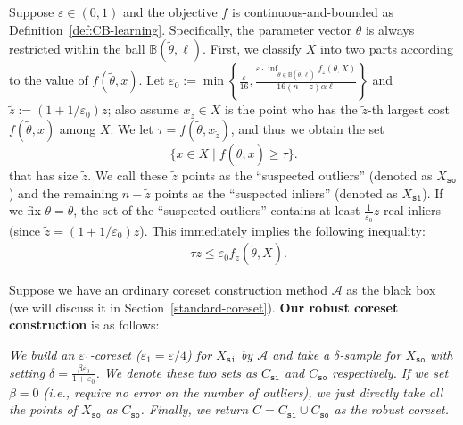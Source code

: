 \documentclass{article}
\begin{document}
Suppose $\varepsilon\in(0,1)$ and  the objective $f$ is continuous-and-bounded as Definition~\ref{def:CB-learning}. Specifically, the parameter vector $\theta$ is always restricted within the ball $\mathbb{B}(\tilde{\theta}, \ell)$.  
First, we classify $ X $ into two parts according to the value of $ f(\tilde{\theta},x) $. 
Let  $\varepsilon_0 := \min \left\{ \frac{\varepsilon}{16},\frac{\varepsilon\cdot\inf_{\theta\in\mathbb{B}(\tilde{\theta}, \ell)} f_z(\theta,X)}{16(n-z)\alpha \ell} \right\} $  and $\tilde{z}:=  \left( 1+1/\varepsilon_0 \right)z$; also assume $x_{\tilde{z}}\in X$ is the point who has the $ \tilde{z}$-th largest cost $ f(\tilde{\theta},x) $ among $X$.  %
We let $ \tau=f(\tilde{\theta},x_{\tilde{z}}) $, and thus we obtain the set 
\begin{equation}\label{markov}
	 \{x\in X\mid f(\tilde{\theta},x)\geq \tau \}.
\end{equation}
that has size $\tilde{z}$. We call these $\tilde{z}$ points as the ``suspected outliers'' (denoted as $X_{\mathtt{so}}$) and the remaining $ n-\tilde{z}$ points as the ``suspected inliers'' (denoted as $X_{\mathtt{si}}$). If we fix $\theta=\tilde{\theta}$, the set of the ``suspected outliers'' contains at least $\frac{1}{\varepsilon_0}z$ real inliers (since $\tilde{z}=\left( 1+1/\varepsilon_0 \right)z$). This immediately implies the following inequality: 
\begin{align}\label{notmarkov}
	&\tau  z \leq \varepsilon_0 f_{z}(\tilde{\theta},X).
\end{align}

Suppose we have an ordinary coreset construction method $\mathcal{A}$ as the black box (we will discuss it in Section~\ref{standard-coreset}).  \textbf{Our robust coreset construction} is as follows:

\vspace{0.1in}
{\em \hspace{0.2in} We build an $ \varepsilon_1 $-coreset ($\varepsilon_1=\varepsilon/4 $) for $X_{\mathtt{si}}$ by $\mathcal{A}$ and  take a $ \delta $-sample for $X_{\mathtt{so}}$ with setting $ \delta=\frac{\beta\varepsilon_0}{1+\varepsilon_0}$. We denote these two sets as $ C_{\mathtt{si}} $ and $ C_{\mathtt{so}} $ respectively. If we set $\beta=0$ ({\em i.e.,} require no error on the number of outliers), we just directly take all the points of  $X_{\mathtt{so}}$ as $ C_{\mathtt{so}} $.  Finally, we return  $ C =C_{\mathtt{si}}\cup C_{\mathtt{so}} $ as the robust coreset. }
\end{document}

